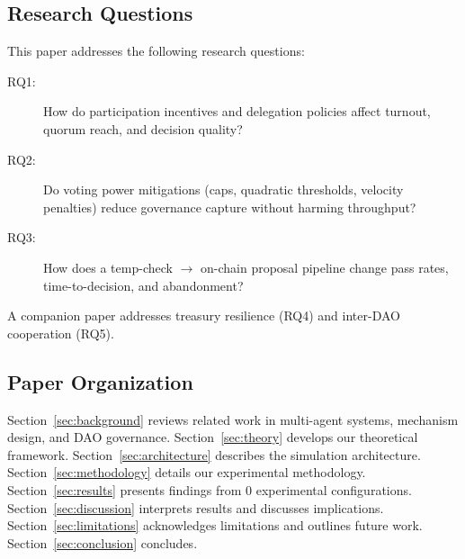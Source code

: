\subsection{Research Questions}

This paper addresses the following research questions:

\begin{description}
    \item[RQ1:] How do participation incentives and delegation policies affect turnout, quorum reach, and decision quality?
    \item[RQ2:] Do voting power mitigations (caps, quadratic thresholds, velocity penalties) reduce governance capture without harming throughput?
    \item[RQ3:] How does a temp-check $\rightarrow$ on-chain proposal pipeline change pass rates, time-to-decision, and abandonment?
\end{description}

\noindent A companion paper addresses treasury resilience (RQ4) and inter-DAO cooperation (RQ5).

\subsection{Paper Organization}

Section~\ref{sec:background} reviews related work in multi-agent systems, mechanism design, and DAO governance. Section~\ref{sec:theory} develops our theoretical framework. Section~\ref{sec:architecture} describes the simulation architecture. Section~\ref{sec:methodology} details our experimental methodology. Section~\ref{sec:results} presents findings from 0 experimental configurations. Section~\ref{sec:discussion} interprets results and discusses implications. Section~\ref{sec:limitations} acknowledges limitations and outlines future work. Section~\ref{sec:conclusion} concludes.
